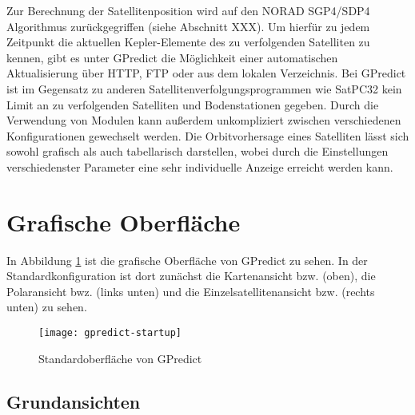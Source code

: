\clearpage

Zur Berechnung der Satellitenposition wird auf den NORAD SGP4/SDP4 Algorithmus zurückgegriffen (siehe Abschnitt XXX). Um hierfür zu jedem Zeitpunkt die aktuellen Kepler-Elemente des zu verfolgenden Satelliten zu kennen, gibt es unter GPredict die Möglichkeit einer automatischen Aktualisierung über HTTP, FTP oder aus dem lokalen Verzeichnis.\newpar
Bei GPredict ist im Gegensatz zu anderen Satellitenverfolgungsprogrammen wie SatPC32 kein Limit an zu verfolgenden Satelliten und Bodenstationen gegeben. Durch die Verwendung von Modulen kann außerdem unkompliziert zwischen verschiedenen Konfigurationen gewechselt werden. Die Orbitvorhersage eines Satelliten lässt sich sowohl grafisch als auch tabellarisch darstellen, wobei durch die Einstellungen verschiedenster Parameter eine sehr individuelle Anzeige erreicht werden kann.

\section{Grafische Oberfläche}

In Abbildung \ref{fig:gpredictstartup} ist die grafische Oberfläche von GPredict zu sehen. In der Standardkonfiguration ist dort zunächst die Kartenansicht bzw.  (oben), die Polaransicht bwz.  (links unten) und die Einzelsatellitenansicht bzw.  (rechts unten) zu sehen.

\begin{figure}[h]
	\centering
	\texttt{[image: gpredict-startup]}
	\caption{Standardoberfläche von GPredict}
	\label{fig:gpredictstartup} 
\end{figure}

\clearpage

\subsection{Grundansichten}

